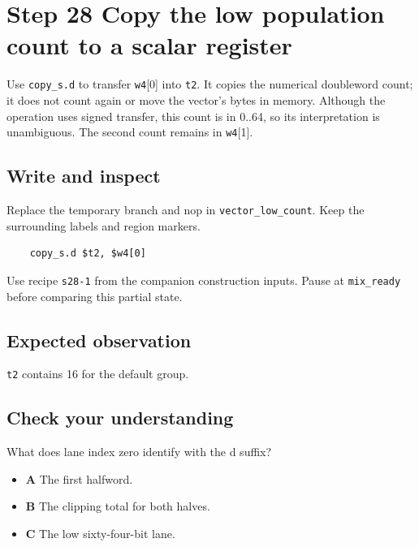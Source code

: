 \section{Step 28 Copy the low population count to a scalar register}\label{pcm-s28}

Use \texttt{copy\_s.d} to transfer \texttt{w4}[0] into \texttt{t2}. It copies the numerical doubleword count; it does not count again or move the vector’s bytes in memory. Although the operation uses signed transfer, this count is in 0..64, so its interpretation is unambiguous. The second count remains in \texttt{w4}[1].

\subsection{Write and inspect}
Replace the temporary branch and nop in \texttt{vector\_low\_count}. Keep the surrounding labels and region markers.

\begin{verbatim}
    copy_s.d $t2, $w4[0]
\end{verbatim}
Use recipe \texttt{s28-1} from the companion construction inputs. Pause at \texttt{mix\_ready} before comparing this partial state.

\subsection{Expected observation}
\texttt{t2} contains 16 for the default group.

\subsection{Check your understanding}
What does lane index zero identify with the d suffix?

\begin{itemize}
\item \textbf{A} The first halfword.
\item \textbf{B} The clipping total for both halves.
\item \textbf{C} The low sixty-four-bit lane.
\end{itemize}
